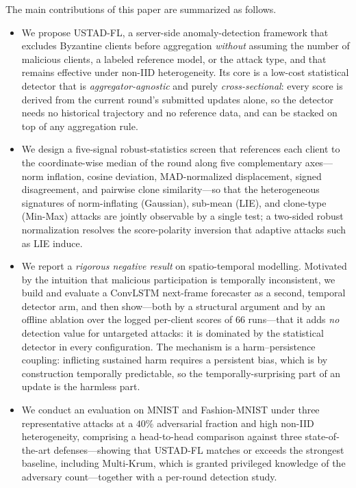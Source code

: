 \documentclass[journal]{IEEEtran}
\begin{document}
The main contributions of this paper are summarized as follows.
\begin{itemize}
    \item We propose USTAD-FL, a server-side anomaly-detection framework that excludes Byzantine clients before aggregation \emph{without} assuming the number of malicious clients, a labeled reference model, or the attack type, and that remains effective under non-IID heterogeneity. Its core is a low-cost statistical detector that is \emph{aggregator-agnostic} and purely \emph{cross-sectional}: every score is derived from the current round's submitted updates alone, so the detector needs no historical trajectory and no reference data, and can be stacked on top of any aggregation rule.
    \item We design a five-signal robust-statistics screen that references each client to the coordinate-wise median of the round along five complementary axes---norm inflation, cosine deviation, MAD-normalized displacement, signed disagreement, and pairwise clone similarity---so that the heterogeneous signatures of norm-inflating (Gaussian), sub-mean (LIE), and clone-type (Min-Max) attacks are jointly observable by a single test; a two-sided robust normalization resolves the score-polarity inversion that adaptive attacks such as LIE induce.
    \item We report a \emph{rigorous negative result} on spatio-temporal modelling. Motivated by the intuition that malicious participation is temporally inconsistent, we build and evaluate a ConvLSTM next-frame forecaster as a second, temporal detector arm, and then show---both by a structural argument and by an offline ablation over the logged per-client scores of $66$ runs---that it adds \emph{no} detection value for untargeted attacks: it is dominated by the statistical detector in every configuration. The mechanism is a harm--persistence coupling: inflicting sustained harm requires a persistent bias, which is by construction temporally predictable, so the temporally-surprising part of an update is the harmless part.
    \item We conduct an evaluation on MNIST and Fashion-MNIST under three representative attacks at a $40\%$ adversarial fraction and high non-IID heterogeneity, comprising a head-to-head comparison against three state-of-the-art defenses---showing that USTAD-FL matches or exceeds the strongest baseline, including Multi-Krum, which is granted privileged knowledge of the adversary count---together with a per-round detection study.
\end{itemize}
\end{document}
